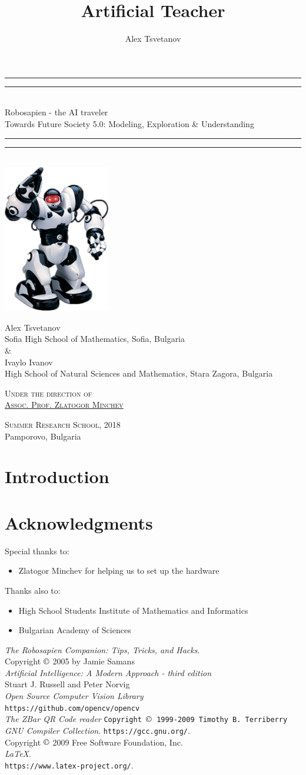 \documentclass[a4paper, 12pt]{article}
\title{Artificial Teacher}
\author{Alex Tsvetanov}
\newcommand{\titleGP}{\begingroup
	\centering
	\rule{\textwidth}{1.6pt}\vspace{-\baselineskip}\vspace{2pt}
	\rule{\textwidth}{0.4pt}\\[\baselineskip]
	
	{\LARGE Robosapien - the AI traveler \\ \small{Towards Future Society 5.0: Modeling, Exploration \& Understanding}}\\[0.2\baselineskip]
	
	\rule{\textwidth}{0.4pt}\vspace{-\baselineskip}\vspace{3.2pt}
	\rule{\textwidth}{1.6pt}\\[\baselineskip]
		\includegraphics[width=0.35\textwidth]{robot.png}
	
	\vspace{50pt}
	{
	{\LARGE Alex Tsvetanov}\\
	{\normalsize Sofia High School of Mathematics, Sofia, Bulgaria}\\\vspace{0.5cm} \& \vspace{0.5cm} \\
	{\LARGE Ivaylo Ivanov}\\
	{\normalsize High School of Natural Sciences and Mathematics, Stara Zagora, Bulgaria}\par}
	
	\vspace{2\baselineskip}
	
	{\scshape \large
		Under the direction of \\
		\hspace{-0.3cm}\href{https://bg.linkedin.com/in/zlatogor-minchev-a101b85}{Assoc. Prof. Zlatogor Minchev} \\\par
	}
	\vspace{1cm}
	
	
	\vfill
	
	{\scshape Summer Research School, 2018} \\[0.3\baselineskip]
	{\large Pamporovo, Bulgaria }\par
	
	\endgroup}
\begin{document}
	
	\titleGP
	\newpage
	
	\tableofcontents
	\newpage
	
	\begin{abstract}
	\end{abstract}
	\newpage
	
	\section{Introduction}
	
	\section{Acknowledgments}
	Special thanks to:
	\begin{itemize}
		\item Zlatogor Minchev for helping us to set up the hardware
	\end{itemize}
	Thanks also to:
	\begin{itemize}
		\item High School Students Institute of Mathematics and Informatics
		\item Bulgarian Academy of Sciences
	\end{itemize}
	\begin{thebibliography}{99}
		{\itshape The Robosapien Companion: Tips, Tricks, and Hacks}.\\
		Copyright $\copyright$ 2005 by Jamie Samans\\
		{\itshape Artificial Intelligence: A Modern Approach - third edition}\\
		Stuart J. Russell and Peter Norvig\\
		
		{\itshape Open Source Computer Vision Library}\\
		\texttt{https://github.com/opencv/opencv} \\
		{\itshape The ZBar QR Code reader}
		\texttt{Copyright $\copyright$ 1999-2009 Timothy B. Terriberry}
		{\itshape GNU Compiler Collection}.
		\texttt{https://gcc.gnu.org/}. \\
		Copyright $\copyright$  2009 Free Software Foundation, Inc. \\
		
		{\itshape \LaTeX}.\\
		\texttt{https://www.latex-project.org/}.
	\end{thebibliography}
\end{document}
